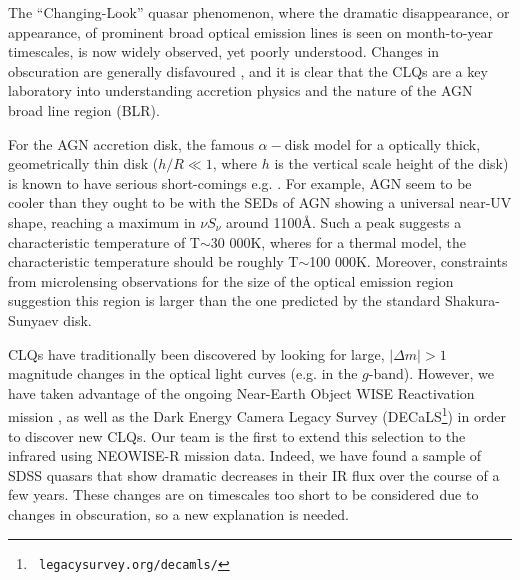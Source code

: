 \documentclass{nature}
\begin{document}
The ``Changing-Look'' quasar phenomenon, where the dramatic
disappearance, or appearance, of prominent broad optical emission
lines is seen on month-to-year timescales, is now widely observed,
\cite{LaMassa2015, MacLeod2016, Runnoe2016, Ruan2016, Gezari2017,
Rumbaugh2017} yet poorly understood. Changes in obscuration are
generally disfavoured \cite{Hutsemekers2017, Sheng2017}, and it is
clear that the CLQs are a key laboratory into understanding accretion
physics and the nature of the AGN broad line region (BLR).

For the AGN accretion disk, the famous $\alpha-$disk model \cite{SS73}
for a optically thick, geometrically thin disk ($h / R \ll 1$, where
$h$ is the vertical scale height of the disk) is known to have serious
short-comings e.g.  \cite{Antonucci1999,
Koratkar_Blaes1999,Lawrence2012}.  For example, AGN seem to be cooler
than they ought to be \cite[e.g., ][]{Lawrence2012} with the SEDs of
AGN showing a universal near-UV shape, reaching a maximum in $\nu
S_{\nu}$ around 1100\AA.  Such a peak suggests a characteristic
temperature of T$\sim$30 000K, wheres for a thermal model, the
characteristic temperature should be roughly T$\sim$100
000K. Moreover, constraints from microlensing observations for the
size of the optical emission region \cite[e.g.,][]{Pooley2007,
Morgan2010, Morgan2012, Mosquera2011} suggestion this region is larger
than the one predicted by the standard Shakura-Sunyaev disk.

CLQs have traditionally been discovered by looking for large, $|
\Delta m | >1$ magnitude changes in the optical light curves (e.g. in
the $g$-band). However, we have taken advantage of the ongoing
Near-Earth Object WISE Reactivation mission \cite[NEOWISE-R;
][]{Mainzer2014, Meisner2017a, Meisner2017b}, as well as the Dark
Energy Camera Legacy Survey (DECaLS\footnote{{\tt
legacysurvey.org/decamls/}}) in order to discover new CLQs. Our team
is the first to extend this selection to the infrared using NEOWISE-R
mission data. Indeed, we have found a sample of SDSS quasars that show
dramatic decreases in their IR flux over the course of a few
years. These changes are on timescales too short to be considered due
to changes in obscuration, so a new explanation is needed.
\end{document}
